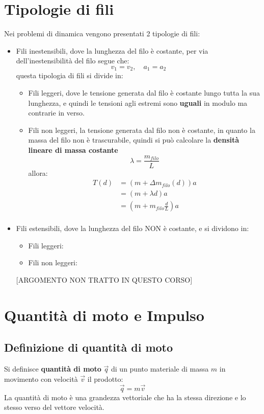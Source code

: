 \documentclass[11pt, a4paper, openright]{book}
\theoremstyle{plain}
\theoremstyle{definition}
\begin{document}
\section{Tipologie di fili}
Nei problemi di dinamica vengono presentati 2 tipologie di fili:
\begin{itemize}
    \item Fili inestensibili, dove la lunghezza del filo è costante, per via dell'inestensibilità del filo segue che:
    \[v_1 = v_2, \quad a_1 = a_2\]
    questa tipologia di fili si divide in:
    \begin{itemize}
        \item Fili leggeri, dove le tensione generata dal filo è costante lungo tutta la sua lunghezza, e quindi le tensioni agli estremi sono \textbf{uguali} in modulo ma contrarie in verso.
        \item Fili non leggeri, la tensione generata dal filo non è costante, in quanto la massa del filo non è trascurabile, quindi si può calcolare la \textbf{densità lineare di massa costante}
        \[\lambda = \frac{m_{filo}}{L}\]
        allora:
        \begin{align}
            T(d) & = (m + \Delta m_{filo}(d))a \\
                 & = (m + \lambda d)a \\
                 & = (m + m_{filo}\frac{d}{L})a \\
        \end{align}
    \end{itemize}
    \item Fili estensibili, dove la lunghezza del filo NON è costante, e si dividono in:
    \begin{itemize}
        \item Fili leggeri:
        \item Fili non leggeri:
    \end{itemize}
    [ARGOMENTO NON TRATTO IN QUESTO CORSO]
\end{itemize}

\newpage

\section{Quantità di moto e Impulso}

\subsection{Definizione di quantità di moto}
Si definisce \textbf{quantità di moto} $\vec{q}$ di un punto materiale di massa $m$ in movimento con velocità $\vec{v}$ il prodotto:
\begin{equation}
    \vec{q} = m\vec{v}
\end{equation}
La quantità di moto è una grandezza vettoriale che ha la stessa direzione e lo stesso verso del vettore velocità.
\end{document}
